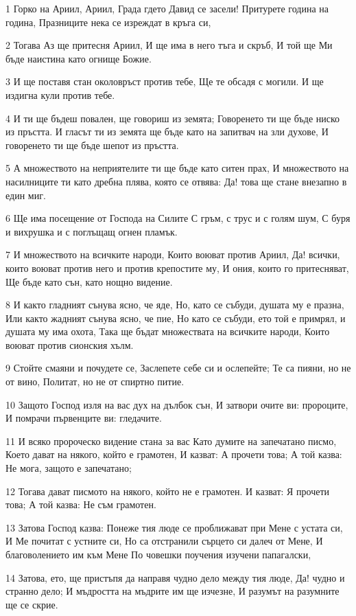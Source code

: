\par 1 Горко на Ариил, Ариил, Града гдето Давид се засели! Притурете година на година, Празниците нека се изреждат в кръга си,
\par 2 Тогава Аз ще притесня Ариил, И ще има в него тъга и скръб, И той ще Ми бъде наистина като огнище Божие.
\par 3 И ще поставя стан околовръст против тебе, Ще те обсадя с могили. И ще издигна кули против тебе.
\par 4 И ти ще бъдеш повален, ще говориш из земята; Говоренето ти ще бъде ниско из пръстта. И гласът ти из земята ще бъде като на запитвач на зли духове, И говоренето ти ще бъде шепот из пръстта.
\par 5 А множеството на неприятелите ти ще бъде като ситен прах, И множеството на насилниците ти като дребна плява, която се отвява: Да! това ще стане внезапно в един миг.
\par 6 Ще има посещение от Господа на Силите С гръм, с трус и с голям шум, С буря и вихрушка и с поглъщащ огнен пламък.
\par 7 И множеството на всичките народи, Които воюват против Ариил, Да! всички, които воюват против него и против крепостите му, И ония, които го притесняват, Ще бъде като сън, като нощно видение.
\par 8 И както гладният сънува ясно, че яде, Но, като се събуди, душата му е празна, Или както жадният сънува ясно, че пие, Но като се събуди, ето той е примрял, и душата му има охота, Така ще бъдат множествата на всичките народи, Които воюват против сионския хълм.
\par 9 Стойте смаяни и почудете се, Заслепете себе си и ослепейте; Те са пияни, но не от вино, Политат, но не от спиртно питие.
\par 10 Защото Господ изля на вас дух на дълбок сън, И затвори очите ви: пророците, И помрачи първенците ви: гледачите.
\par 11 И всяко пророческо видение стана за вас Като думите на запечатано писмо, Което дават на някого, който е грамотен, И казват: А прочети това; А той казва: Не мога, защото е запечатано;
\par 12 Тогава дават писмото на някого, който не е грамотен. И казват: Я прочети това; А той казва: Не съм грамотен.
\par 13 Затова Господ казва: Понеже тия люде се проближават при Мене с устата си, И Ме почитат с устните си, Но са отстранили сърцето си далеч от Мене, И благоволението им към Мене По човешки поучения изучени папагалски,
\par 14 Затова, ето, ще пристъпя да направя чудно дело между тия люде, Да! чудно и странно дело; И мъдростта на мъдрите им ще изчезне, И разумът на разумните ще се скрие.
